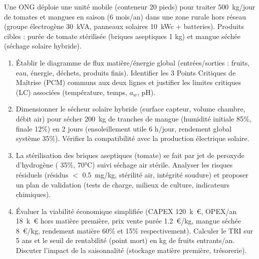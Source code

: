 \documentclass[11pt]{article}
\begin{document}
\begin{exercice}
Une ONG déploie une unité mobile (conteneur 20 pieds) pour traiter \SI{500}{kg/jour} de tomates et mangues en saison (6 mois/an) dans une zone rurale hors réseau (groupe électrogène \SI{30}{kVA}, panneaux solaires \SI{10}{kWc} + batteries). Produits cibles : purée de tomate stérilisée (briques aseptiques 1 kg) et mangue séchée (séchage solaire hybride).
\begin{enumerate}
    \item Établir le diagramme de flux matière/énergie global (entrées/sorties : fruits, eau, énergie, déchets, produits finis). Identifier les 3 Points Critiques de Maîtrise (PCM) communs aux deux lignes et justifier les limites critiques (LC) associées (température, temps, $a_w$, pH).
    \item Dimensionner le sécheur solaire hybride (surface capteur, volume chambre, débit air) pour sécher \SI{200}{kg} de tranches de mangue (humidité initiale 85\%, finale 12\%) en 2 jours (ensoleillement utile 6 h/jour, rendement global système 35\%). Vérifier la compatibilité avec la production électrique solaire.
    \item La stérilisation des briques aseptiques (tomate) se fait par jet de peroxyde d'hydrogène ( 35\%, 70°C) suivi séchage air stérile. Analyser les risques résiduels (résidus  $<$ \SI{0,5}{mg/kg}, stérilité air, intégrité soudure) et proposer un plan de validation (tests de charge, milieux de culture, indicateurs chimiques).
    \item Évaluer la viabilité économique simplifiée (CAPEX \SI{120}{k€}, OPEX/an \SI{18}{k€} hors matière première, prix vente purée \SI{1,2}{€/kg}, mangue séchée \SI{8}{€/kg}, rendement matière 60\% et 15\% respectivement). Calculer le TRI sur 5 ans et le seuil de rentabilité (point mort) en kg de fruits entrants/an. Discuter l'impact de la saisonnalité (stockage matière première, trésorerie).
\end{enumerate}
\end{exercice}
\end{document}
